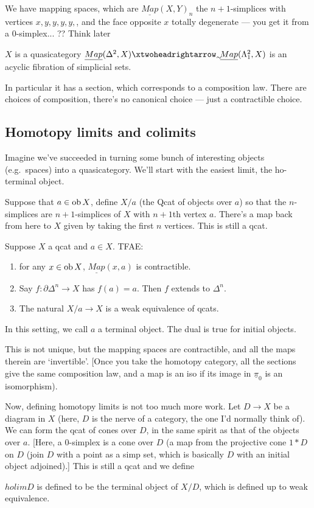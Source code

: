 \documentclass[11pt]{article}
\begin{document}
\begin{SaulInftyOneCats}
We have mapping spaces, which are $\underline{Map}(X,Y)_n$ the $n+1$-simplices with vertices $x,y,y,y,y,$, and the face opposite $x$ totally degenerate --- you get it from a 0-simplex... ?? Think later
\begin{thm*}[joyal]
$X$ is a quasicategory \Iff $\underline{Map}(\Delta^2,X)\acyclicfibration\underline{Map}(\Lambda^2_1,X)$ is an acyclic fibration of simplicial sets.
\end{thm*}
In particular it has a section, which corresponds to a composition law. There are choices of composition, there's no canonical choice --- just a contractible choice.

\subsection*{Homotopy limits and colimits}
Imagine we've succeeded in turning some bunch of interesting objects (e.g.\ spaces) into a quasicategory. We'll start with the easiest limit, the ho-terminal object.

Suppose that $a\in\textup{ob}\, X$, define $X/a$ (the Qcat of objects over $a$) so that the $n$-simplices are $n+1$-simplices of $X$ with $n+1$th vertex $a$. There's a map back from here to $X$ given by taking the first $n$ vertices. This is still a qcat.
\begin{thm*}[ThmDef]
Suppose $X$ a qcat and $a\in X$. TFAE:
\begin{enumerate}\squishlist
\item for any $x\in\textup{ob}\, X$, $\underline{Map}(x,a)$ is contractible.
\item Say $f:\partial \Delta^n\to X$ has $f(a)=a$. Then $f$ extends to $\Delta^n$.
\item The natural $X/a\to X$ is a weak equivalence of qcats.
\end{enumerate}
In this setting, we call $a$ a terminal object. The dual is true for initial objects.
\end{thm*}
This is not unique, but the mapping spaces are contractible, and all the maps therein are `invertible'. [Once you take the homotopy category, all the sections give the same composition law, and a map is an iso if its image in $\underline\pi_0$ is an isomorphism).

Now, defining homotopy limits is not too much more work. Let $D\to X$ be a diagram in $X$ (here, $D$ is the nerve of a category, the one I'd normally think of). We can form the qcat of cones over $D$, in the same spirit as that of the objects over $a$. [Here, a 0-simplex is a cone over $D$ (a map from the projective cone $1*D$ on $D$ (join $D$ with a point as a simp set, which is basically $D$ with an initial object adjoined).] This is still a qcat and we define
\begin{defn*}
$holim D$ is defined to be the terminal object of $X/D$, which is defined up to weak equivalence.
\end{defn*}

\end{SaulInftyOneCats}
\end{document}
